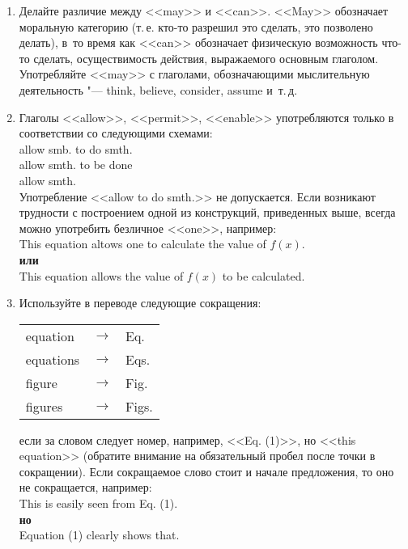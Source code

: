 \documentclass[a5paper, 10pt, twoside, numbers=enddot]{scrartcl}
\newcommand{\etc}{и~т.\,д.\xspace}
\newcommand{\ie}{т.\,е.\xspace}
\begin{document}
\begin{enumerate}
  \item Делайте различие между <<may>> и <<can>>. <<May>> обозначает моральную категорию (\ie кто-то
    разрешил это сделать, это позволено делать), в~то время как <<can>> обозначает физическую
    возможность что-то сделать, осу\-ществимость действия, выражаемого основным глаголом. Употребляйте
    <<may>> с глаголами, обозначающими мыслительную деятельность "--- think, believe, consider,
    assume \etc

  \item Глаголы <<allow>>, <<permit>>, <<enable>> употребляются только в соответствии со следующими
    схемами:\\ [4pt] \textsf{
      allow smb. to do smth.\\
      allow smth. to be done\\
      allow smth.\\ [4pt]}
    Употребление <<allow to do smth.>> не допускается. Если возникают трудности с построением одной
    из конструкций, приведенных выше, всегда можно употребить безличное <<one>>, например:\\ [4pt]
    \textsf{
      This equation altows one to calculate the value of $f(x)$.\\ [4pt]
      \textbf{или}\\ [4pt]
      This equation allows the value of $f(x)$ to be calculated.
    }

  \item Используйте в переводе следующие сокращения:
    \begin{center}
      \sffamily
      \begin{tabular}{lll}
        equation  & $\rightarrow$ & Eq.\\
        equations & $\rightarrow$ & Eqs.\\
        figure    & $\rightarrow$ & Fig.\\
        figures   & $\rightarrow$ & Figs.\\
      \end{tabular}
    \end{center}
    если за словом следует номер, например, <<Eq. (1)>>, но <<this equation>> (обратите внимание на
    обязательный пробел после точки в сокращении). Если сокращаемое слово стоит и начале предложения,
    то оно не сокращается, например:\\ [4pt]
    \textsf{
      This is easily seen from Eq. (1).\\ [4pt]
      \textbf{но}\\ [4pt]
      Equation (1) clearly shows that.
    }


\end{enumerate}
\end{document}
